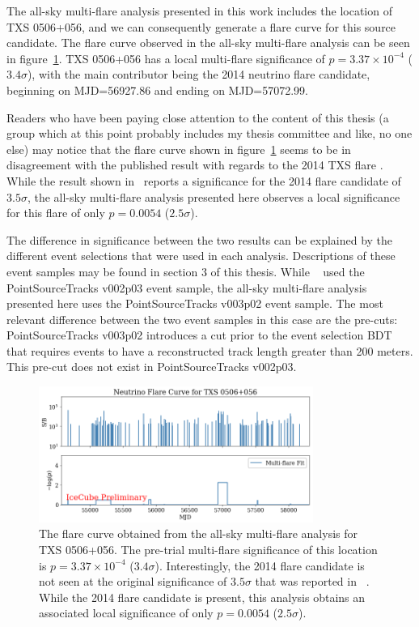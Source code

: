 The all-sky multi-flare analysis presented in this work includes the location of TXS 0506+056, and we can consequently generate a flare curve for this source candidate. The flare curve observed in the all-sky multi-flare analysis can be seen in figure~\ref{fig:fcurve_txs}. TXS 0506+056 has a local multi-flare significance of $p=3.37 \times 10^{-4}$ ($3.4 \sigma$), with the main contributor being the 2014 neutrino flare candidate, beginning on MJD=56927.86 and ending on MJD=57072.99.

Readers who have been paying close attention to the content of this thesis (a group which at this point probably includes my thesis committee and like, no one else) may notice that the flare curve shown in figure~\ref{fig:fcurve_txs} seems to be in disagreement with the published result with regards to the 2014 TXS flare . While the result shown in~\cite{TXS_Archival} reports a significance for the 2014 flare candidate of $3.5 \sigma$, the all-sky multi-flare analysis presented here observes a local significance for this flare of only $p=0.0054$ ($2.5 \sigma$).

The difference in significance between the two results can be explained by the different event selections that were used in each analysis. Descriptions of these event samples may be found in section 3 of this thesis. While ~\cite{TXS_Multimessenger} used the PointSourceTracks v002p03 event sample, the all-sky multi-flare analysis presented here uses the PointSourceTracks v003p02 event sample. The most relevant difference between the two event samples in this case are the pre-cuts: PointSourceTracks v003p02 introduces a cut prior to the event selection BDT that requires events to have a reconstructed track length greater than 200 meters. This pre-cut does not exist in PointSourceTracks v002p03. 

\begin{figure}[h]
\centering
\includegraphics[width=0.8\textwidth]{figs/fcurve_TXS.png}
\caption{The flare curve obtained from the all-sky multi-flare analysis for TXS 0506+056. The pre-trial multi-flare significance of this location is $p=3.37 \times 10^{-4}$ ($3.4 \sigma$). Interestingly, the 2014 flare candidate is not seen at the original significance of $3.5 \sigma$ that was reported in ~\cite{TXS_Multimessenger}. While the 2014 flare candidate is present, this analysis obtains an associated local significance of only $p=0.0054$ ($2.5 \sigma$). }
\label{fig:fcurve_txs}
\end{figure}

